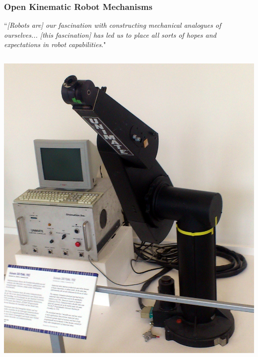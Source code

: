 \begin{frame}
	\frametitle{Open Kinematic Robot Mechanisms}
	\begin{definition}
		``\footnotesize \textit{[Robots are] our fascination with constructing mechanical analogues of ourselves... [this fascination] has led us to place all sorts of hopes and expectations in robot capabilities}."
	\end{definition}
	\begin{columns}[t]
		\begin{column}{5cm}
			\begin{minipage}[b]{.5\textwidth}
				\includegraphics[width=1.5\textwidth, height=1.5\textwidth]{../Notes/figures/PUMA.jpg} \\

\end{minipage}
\end{column}
\end{columns}
\end{frame}
